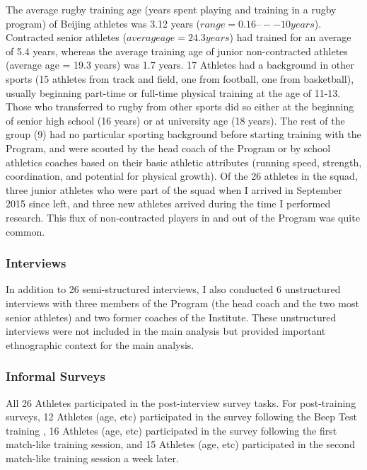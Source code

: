 The average rugby training age (years spent playing and training in a rugby program) of Beijing athletes was 3.12 years ($range = 0.16 –-- 10 years$).  Contracted senior athletes ($average age = 24.3 years$) had trained for an average of 5.4 years, whereas the average training age of junior non-contracted athletes (average age = 19.3 years) was 1.7 years.  17 Athletes had a background in other sports (15 athletes from track and field, one from football, one from basketball), usually beginning part-time or full-time physical training at the age of 11-13.  Those who transferred to rugby from other sports did so either at the beginning of senior high school (16 years) or at university age (18 years).  The rest of the group (9) had no particular sporting background before starting training with the Program, and were scouted by the head coach of the Program or by school athletics coaches based on their basic athletic attributes (running speed, strength, coordination, and potential for physical growth).  Of the 26 athletes in the squad, three junior athletes who were part of the squad when I arrived in September 2015 since left, and three new athletes arrived during the time I performed research. This flux of non-contracted players in and out of the Program was quite common.


  \subsubsection{Interviews}

  In addition to 26 semi-structured interviews, I also conducted 6 unstructured interviews with three members of the Program (the head coach and the two most senior athletes) and two former coaches of the Institute.  These unstructured interviews were not included in the main analysis but provided important ethnographic context for the main analysis.

  \subsubsection{Informal Surveys}

  All 26 Athletes participated in the post-interview survey tasks.  For post-training surveys, 12 Athletes (age, etc) participated in the survey following the Beep Test training , 16 Athletes (age, etc) participated in the survey following the first match-like training session, and 15 Athletes (age, etc) participated in the second match-like training session a week later.

